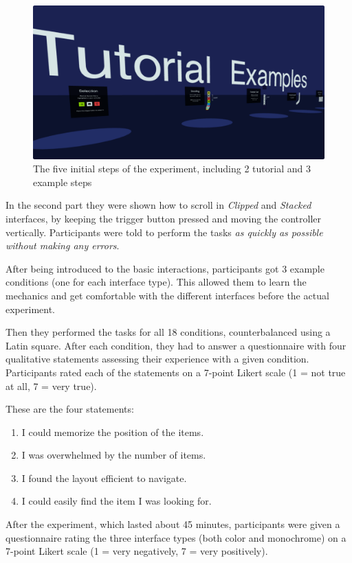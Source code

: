 \documentclass{tufte-book} %
\begin{document}
\begin{figure}
  \includegraphics{tutorials.png}
  \caption{The five initial steps of the experiment, including 2 tutorial and 3 example steps}
  \label{fig:tutorials}
\end{figure}

In the second part they were shown how to scroll in \emph{Clipped} and \emph{Stacked} interfaces, by keeping the trigger button pressed and moving the controller vertically.
Participants were told to perform the tasks \emph{as quickly as possible without making any errors}.

After being introduced to the basic interactions, participants got 3 example conditions (one for each interface type). This allowed them to learn the mechanics and get comfortable with the different interfaces before the actual experiment.

Then they performed the tasks for all 18 conditions, counterbalanced using a Latin square. After each condition, they had to answer a questionnaire with four qualitative statements assessing their experience with a given condition. Participants rated each of the statements on a 7-point Likert scale (1 = not true at all, 7 = very true).

These are the four statements:

\begin{enumerate}[label=\arabic*. , wide=0.5em,  leftmargin=*]
  \item I could memorize the position of the items.
  \item I was overwhelmed by the number of items.
  \item I found the layout efficient to navigate.
  \item I could easily find the item I was looking for.
\end{enumerate}

After the experiment, which lasted about 45 minutes, participants were given a questionnaire rating the three interface types (both color and monochrome) on a 7-point Likert scale (1 = very negatively, 7 = very positively).
\end{document}
